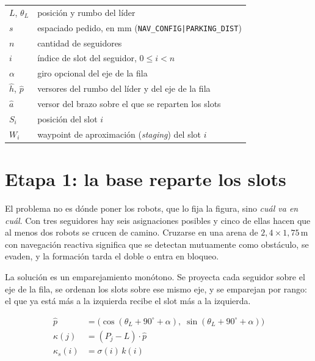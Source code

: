 \documentclass[11pt,a4paper]{article}
\theoremstyle{plain}
\newcommand{\cmd}[1]{\texttt{#1}}
\newcommand{\hh}{\hat{h}}
\newcommand{\pp}{\hat{p}}
\newcommand{\aaa}{\hat{a}}
\begin{document}
\noindent
\begin{tabular}{@{}ll@{}}
  $L$, $\theta_L$ & posición y rumbo del líder \\
  $s$             & espaciado pedido, en mm (\cmd{NAV\_CONFIG|PARKING\_DIST}) \\
  $n$             & cantidad de seguidores \\
  $i$             & índice de slot del seguidor, $0 \le i < n$ \\
  $\alpha$        & giro opcional del eje de la fila \\
  $\hh$, $\pp$    & versores del rumbo del líder y del eje de la fila \\
  $\aaa$          & versor del brazo sobre el que se reparten los slots \\
  $S_i$           & posición del slot $i$ \\
  $W_i$           & waypoint de aproximación (\emph{staging}) del slot $i$ \\
\end{tabular}

\section{Etapa 1: la base reparte los slots}

El problema no es dónde poner los robots, que lo fija la figura, sino
\emph{cuál va en cuál}. Con tres seguidores hay seis asignaciones posibles y
cinco de ellas hacen que al menos dos robots se crucen de camino. Cruzarse en
una arena de $2{,}4 \times 1{,}75$\,m con navegación reactiva significa que se
detectan mutuamente como obstáculo, se evaden, y la formación tarda el doble o
entra en bloqueo.

La solución es un emparejamiento monótono. Se proyecta cada seguidor sobre el
eje de la fila, se ordenan los slots sobre ese mismo eje, y se emparejan por
rango: el que ya está más a la izquierda recibe el slot más a la izquierda.

\begin{align}
  \pp &= \bigl(\cos(\theta_L + 90^\circ + \alpha),\;
               \sin(\theta_L + 90^\circ + \alpha)\bigr)
  \label{eq:eje}\\[2pt]
  \kappa(j) &= (P_j - L)\cdot\pp
  \label{eq:clave-seg}\\[2pt]
  \kappa_s(i) &= \sigma(i)\,k(i)
  \label{eq:clave-slot}
\end{align}
\end{document}
